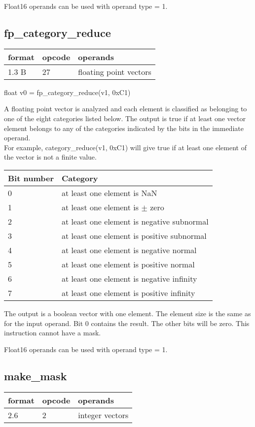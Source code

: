 \documentclass[forwardcom.tex]{subfiles}
\begin{document}
Float16 operands can be used with operand type = 1.
\vv


\subsection{fp\_category\_reduce}
\label{table:fpCategoryReduceInstruction}
\begin{tabular}{|p{12mm}|p{15mm}|p{100mm}|}
\hline
\bfseries format & \bfseries opcode & \bfseries operands \\ \hline
1.3 B & 27 & floating point vectors \\ \hline
\end{tabular}
\vv

float v0 = fp\_category\_reduce(v1, 0xC1)
\vv

A floating point vector is analyzed and each element is classified as belonging to one of the eight categories listed below. The output is true if at least one vector element belongs to any of the categories indicated by the bits in the immediate operand. \\
For example, category\_reduce(v1, 0xC1) will give true if at least one element of the vector is not a finite value.
\vv

\begin{tabular}{|p{24mm}|p{115mm}|}
\hline
\bfseries Bit number & \bfseries Category \\ \hline
0 & at least one element is NaN \\
1 & at least one element is $\pm$ zero \\
2 & at least one element is negative subnormal \\
3 & at least one element is positive subnormal \\
4 & at least one element is negative normal \\
5 & at least one element is positive normal \\
6 & at least one element is negative infinity \\
7 & at least one element is positive infinity \\
\hline
\end{tabular}
\vv

The output is a boolean vector with one element. The element size is the same as for the input operand. Bit 0 contains the result. The other bits will be zero. 
This instruction cannot have a mask.
\vv

Float16 operands can be used with operand type = 1.
\vv


\subsection{make\_mask}
\label{table:makeMaskInstruction}
\begin{tabular}{|p{12mm}|p{15mm}|p{100mm}|}
\hline
\bfseries format & \bfseries opcode & \bfseries operands \\ \hline
2.6 &  2 & integer vectors \\ \hline
\end{tabular}
\vv
\end{document}
